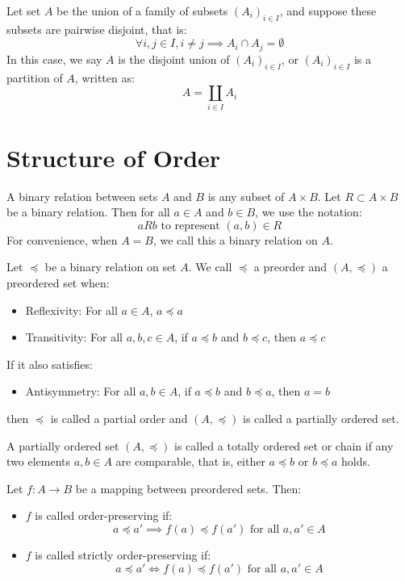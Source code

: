 \documentclass[11pt,lang=en]{elegantbook}
\begin{document}
\begin{definition}
  Let set $A$ be the union of a family of subsets $(A_i)_{i \in I}$, and suppose these subsets are pairwise disjoint, that is:
  \[
    \forall i,j \in I, i \neq j \implies A_i \cap A_j = \emptyset
  \]
  In this case, we say $A$ is the disjoint union of $(A_i)_{i \in I}$, or $(A_i)_{i \in I}$ is a partition of $A$, written as:
  \[
    A = \coprod_{i \in I} A_i
  \]
\end{definition}

\section{Structure of Order}

\begin{definition}
  A binary relation between sets $A$ and $B$ is any subset of $A \times B$. Let $R \subset A \times B$ be a binary relation. Then for all $a \in A$ and $b \in B$, we use the notation:
  \[
    aRb \text{ to represent } (a,b) \in R
  \]
  For convenience, when $A = B$, we call this a binary relation on $A$.
\end{definition}

\begin{definition}
  Let $\preceq$ be a binary relation on set $A$. We call $\preceq$ a preorder and $(A,\preceq)$ a preordered set when:
  \begin{itemize}
    \item Reflexivity: For all $a \in A$, $a \preceq a$
    \item Transitivity: For all $a,b,c \in A$, if $a \preceq b$ and $b \preceq c$, then $a \preceq c$
  \end{itemize}

  If it also satisfies:
  \begin{itemize}
    \item Antisymmetry: For all $a,b \in A$, if $a \preceq b$ and $b \preceq a$, then $a = b$
  \end{itemize}
  then $\preceq$ is called a partial order and $(A,\preceq)$ is called a partially ordered set.

  A partially ordered set $(A,\preceq)$ is called a totally ordered set or chain if any two elements $a,b \in A$ are comparable, that is, either $a \preceq b$ or $b \preceq a$ holds.
\end{definition}

\begin{definition}
  Let $f : A \to B$ be a mapping between preordered sets. Then:
  \begin{itemize}
    \item $f$ is called order-preserving if:
      \[
        a \preceq a' \implies f(a) \preceq f(a') \text{ for all } a,a' \in A
      \]

    \item $f$ is called strictly order-preserving if:
      \[
        a \preceq a' \iff f(a) \preceq f(a') \text{ for all } a,a' \in A
      \]
  \end{itemize}
\end{definition}
\end{document}
